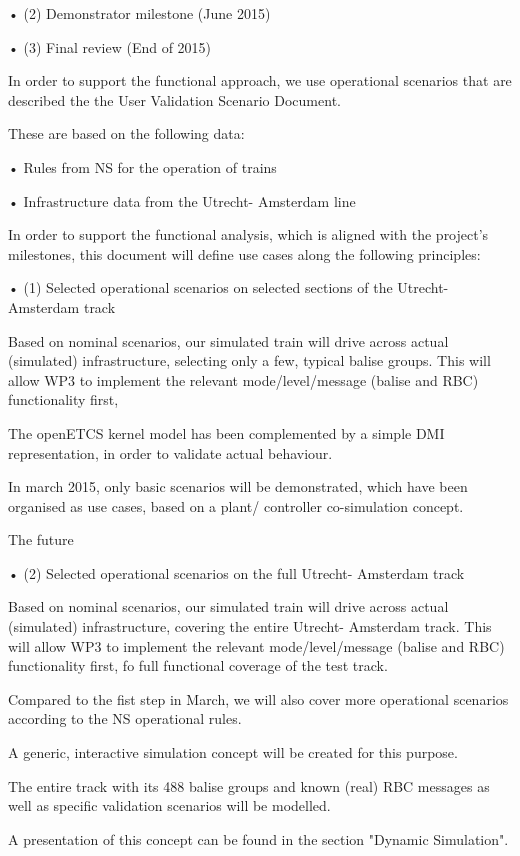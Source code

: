 •  (2) Demonstrator milestone (June 2015)

•  (3) Final review (End of 2015)

In order to support the functional approach, we use operational scenarios that are described the the User Validation Scenario Document.

These are based on the following data:

•  Rules from NS for the operation of trains

•  Infrastructure data from the Utrecht- Amsterdam line

In order to support the functional analysis, which is aligned with the project's milestones, this document will define use cases along the following principles:

•  (1) Selected operational scenarios on selected sections of the Utrecht- Amsterdam track

Based on nominal scenarios, our simulated train will drive across actual (simulated) infrastructure, selecting only a few, typical balise groups.
This will allow WP3 to implement the relevant mode/level/message (balise and RBC) functionality first,

The openETCS kernel model has been complemented by a simple DMI representation, in order to validate actual behaviour. 

In march 2015, only basic scenarios will be demonstrated, which have been organised as use cases, based on a plant/ controller co-simulation concept.

The future 


•  (2) Selected operational scenarios on the full Utrecht- Amsterdam track

Based on nominal scenarios, our simulated train will drive across actual (simulated) infrastructure, covering the entire Utrecht- Amsterdam track.
This will allow WP3 to implement the relevant mode/level/message (balise and RBC) functionality first, fo full functional coverage of the test track.

Compared to the fist step in March, we will also cover more operational scenarios according to the NS operational rules.

A generic, interactive simulation concept will be created for this purpose. 

The entire track with its 488 balise groups and known (real) RBC messages as well as specific validation scenarios will be modelled.

A presentation of this concept can be found in the section "Dynamic Simulation".

